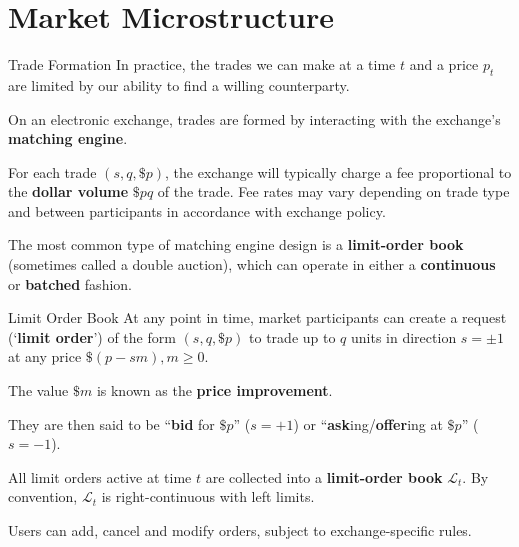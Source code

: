 \documentclass{beamer}
\newcommand{\sectionquote}[1]{\def\insertsquote{#1}}
\newcommand{\insertsquote}{}
\renewcommand{\insertsquote}{}
\begin{document}
\sectionquote{``Certainly, the modern compendium of mental illnesses (DSM-5) takes a dim view of people who think everyone is out to get them. Yet financial markets are different: people really are out to get you, after all.'' - Agustin Lebron, The Laws of Trading}
\section{Market Microstructure}
\begin{frame}{Trade Formation}
	In practice, the trades we can make at a time $t$ and a price $p_t$ are limited by our ability to find a willing counterparty.

	On an electronic exchange, trades are formed by interacting with the exchange's \textbf{matching engine}.%

	\pause

	For each trade $(s,q,\$p)$, the exchange will typically charge a fee proportional to the \textbf{dollar volume} $\$pq$ of the trade. Fee rates may vary depending on trade type and between participants in accordance with exchange policy.

	\pause

	The most common type of matching engine design is a \textbf{limit-order book} (sometimes called a double auction), which can operate in either a \textbf{continuous} or \textbf{batched} fashion.
\end{frame}

\begin{frame}{Limit Order Book}%
	At any point in time, market participants can create a request (`\textbf{limit order}') of the form $(s,q,\$p)$ to trade up to $q$ units in direction $s=\pm1$ at any price $\$(p-sm), m\geq0$.%

	The value $\$m$ is known as the \textbf{price improvement}. %
	
	They are then said to be ``\textbf{bid} for $\$p$'' ($s=+1$) or ``\textbf{ask}ing/\textbf{offer}ing at $\$p$'' ($s=-1$). %

	\pause

	All limit orders active at time $t$ are collected into a \textbf{limit-order book} $\mathcal{L}_t$. By convention, $\mathcal{L}_t$ is right-continuous with left limits.%

	Users can add, cancel and modify orders, subject to exchange-specific rules.%
\end{frame}
\end{document}
